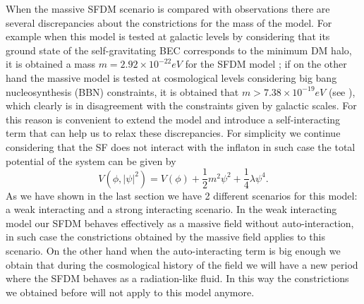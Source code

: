 \documentclass[amssymb,twocolumn,prd,nofootinbib,showpacs]{revtex4-1}
\begin{document}
When the massive SFDM scenario is compared with observations there are several discrepancies about the constrictions for the mass of the model. For example when this model is tested at galactic levels by considering that its ground state of the self-gravitating BEC corresponds to the minimum DM halo, it is obtained a mass $m=2.92\times 10^{-22}eV$ for the SFDM model \cite{massconst1,SFphi42}; if on the other hand the massive model is tested at cosmological levels considering big bang nucleosynthesis (BBN) constraints, it is obtained that $m>7.38\times 10^{-19}eV$ (see \cite{SFphi41,SFphi42}), which clearly is in disagreement with the constraints given by galactic scales. For this reason is convenient to extend the model and introduce a self-interacting term that can help us to relax these discrepancies. For simplicity we continue considering that the SF does not interact with the inflaton in such case the total potential of the system can be given by
\begin{equation}
V(\phi,|\psi|^2)=V(\phi)+\frac{1}{2}m^2\psi^2+\frac{1}{4}\lambda\psi^4.
\end{equation}
As we have shown in the last section we have 2 different scenarios for this model: a weak interacting and a strong interacting scenario. In the weak interacting model our SFDM behaves effectively as a massive field without auto-interaction, in such case the constrictions obtained by the massive field applies to this scenario. On the other hand when the auto-interacting term is big enough we obtain that during the cosmological history of the field we will have a new period where the SFDM behaves as a radiation-like fluid. In this way the constrictions we obtained before will not apply to this model anymore.
\end{document}
